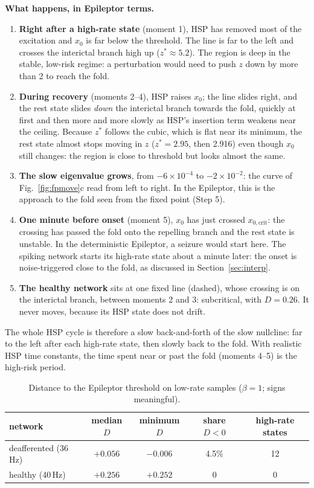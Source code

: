 \documentclass[11pt]{article}
\newcommand{\xc}{x_{0,\mathrm{crit}}}
\begin{document}
\textbf{What happens, in Epileptor terms.}
\begin{enumerate}
\item \textbf{Right after a high-rate state} (moment 1), HSP has removed most of the excitation and $x_0$ is far below the
threshold. The line is far to the left and crosses the interictal branch high up ($z^*\approx5.2$). The region is deep in
the stable, low-risk regime: a perturbation would need to push $z$ down by more than 2 to reach the fold.
\item \textbf{During recovery} (moments 2--4), HSP raises $x_0$; the line slides right, and the rest state slides
\emph{down} the interictal branch towards the fold, quickly at first and then more and more slowly as HSP's insertion term
weakens near the ceiling. Because $z^*$ follows the cubic, which is flat near its minimum, the rest state almost stops
moving in $z$ ($z^* = 2.95$, then 2.916) even though $x_0$ still changes: the region is close to threshold but looks
almost the same.
\item \textbf{The slow eigenvalue grows}, from $-6\times10^{-4}$ to $-2\times10^{-2}$: the curve of Fig.~\ref{fig:fpmove}c
read from left to right. In the Epileptor, this is the approach to the fold seen from the fixed point (Step 5).
\item \textbf{One minute before onset} (moment 5), $x_0$ has just crossed $\xc$: the crossing has passed the fold onto
the repelling branch and the rest state is unstable. In the deterministic Epileptor, a seizure would start here. The spiking
network starts its high-rate state about a minute later: the onset is noise-triggered close to the fold, as discussed in
Section~\ref{sec:interp}.
\item \textbf{The healthy network} sits at one fixed line (dashed), whose crossing is on the interictal branch, between moments
2 and 3: subcritical, with $D = 0.26$. It never moves, because its HSP state does not drift.
\end{enumerate}
The whole HSP cycle is therefore a slow back-and-forth of the slow nullcline: far to the left after each high-rate state,
then slowly back to the fold. With realistic HSP time constants, the time spent near or past the fold (moments 4--5) is the
high-risk period.

\begin{table}[H]\centering\small
\begin{tabular}{lcccc}
\toprule
network & median $D$ & minimum $D$ & share $D<0$ & high-rate states \\
\midrule
deafferented (36\,Hz) & $+0.056$ & $-0.006$ & 4.5\% & 12 \\
healthy (40\,Hz) & $+0.256$ & $+0.252$ & 0 & 0 \\
\bottomrule
\end{tabular}
\caption{Distance to the Epileptor threshold on low-rate samples ($\beta=1$; signs meaningful).}\label{tab:D}
\end{table}
\end{document}
